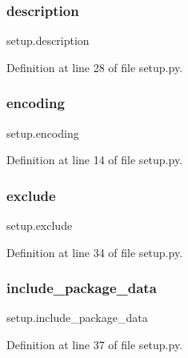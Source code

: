 \subsubsection{\texorpdfstring{description}{description}}
{\footnotesize\ttfamily setup.\+description}



Definition at line 28 of file setup.\+py.

\mbox{\label{namespacesetup_a443be2d01fd539bf6761aff70724d876}} 
\subsubsection{\texorpdfstring{encoding}{encoding}}
{\footnotesize\ttfamily setup.\+encoding}



Definition at line 14 of file setup.\+py.

\mbox{\label{namespacesetup_a49b34d9a29763a7757a7cb00821e651d}} 
\subsubsection{\texorpdfstring{exclude}{exclude}}
{\footnotesize\ttfamily setup.\+exclude}



Definition at line 34 of file setup.\+py.

\mbox{\label{namespacesetup_a35139105b25ef46629d31888bad595d8}} 
\subsubsection{\texorpdfstring{include\+\_\+package\+\_\+data}{include\_package\_data}}
{\footnotesize\ttfamily setup.\+include\+\_\+package\+\_\+data}



Definition at line 37 of file setup.\+py.

\mbox{\label{namespacesetup_abead4f26b530856f858f0d44c7cf2588}} 
